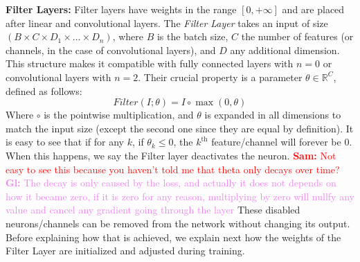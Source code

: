 \documentclass[sigconf]{acmart}
\newcommand{\srm}[1]{\textcolor{red}{{\bf Sam:} #1}}
\newcommand{\gl}[1]{\textcolor{violet}{{\bf Gl:} #1}}
\begin{document}
\textbf{Filter Layers: } Filter layers have weights in the range $[0,+\infty]$ and are placed after
linear and convolutional layers.
The \textit{Filter Layer} takes an input of size $\left(B \times C \times D_1
  \times \dots \times D_n\right)$, where $B$ is the batch size, $C$ the number
of features (or channels, in the case of convolutional layers), and $D$ any
additional dimension. This structure makes it compatible with fully connected
layers with $n=0$ or convolutional layers with $n=2$. Their crucial property is
a parameter $\theta \in \mathbb{R}^C$, defined as follows: \vspace{-1em}
\begin{equation} Filter(I;\theta) = I \circ \max(0, \theta) \end{equation}
Where $\circ$ is the pointwise multiplication, and $\theta$ is expanded in all
dimensions to match the input size (except the second one since they are equal by definition). It is easy to see that if for any
$k$, if $\theta_k \leq 0$, the $k^{\text{th}}$ feature/channel will forever be
$0$. When this happens, we say the Filter layer deactivates the neuron.
\srm{Not easy to see this because you haven't told me that theta only decays
  over time?} \gl{The decay is only caused by the loss, and actually it does not depends on how it became zero, if it is zero for any reason, multiplying by zero will nullfy any value and cancel any gradient going through the layer} These disabled neurons/channels can be removed from the network
without changing its output. Before explaining how that is achieved, we explain
next how the weights of the Filter Layer are initialized and adjusted during training.



%
%
%
\end{document}
